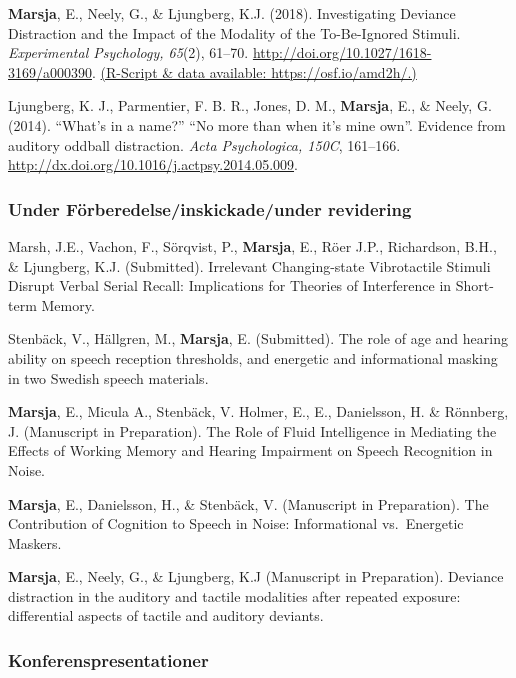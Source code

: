 \documentclass[]{article}
\begin{document}
\textbf{Marsja}, E., Neely, G., \& Ljungberg, K.J. (2018). Investigating
Deviance Distraction and the Impact of the Modality of the To-Be-Ignored
Stimuli. \emph{Experimental Psychology, 65}(2), 61--70.
\url{http://doi.org/10.1027/1618-3169/a000390}.
\href{https://osf.io/amd2h/}{(R-Script \& data available:
https://osf.io/amd2h/.)}

Ljungberg, K. J., Parmentier, F. B. R., Jones, D. M., \textbf{Marsja},
E., \& Neely, G. (2014). ``What's in a name?'' ``No more than when it's
mine own''. Evidence from auditory oddball distraction. \emph{Acta
Psychologica, 150C}, 161--166.
\href{http://doi.org/10.1027/1618-3169/a000390}{http://dx.doi.org/10.1016/j.actpsy.2014.05.009}.

\hypertarget{under-fuxf6rberedelseinskickadeunder-revidering}{%
\subsubsection{Under Förberedelse/inskickade/under
revidering}\label{under-fuxf6rberedelseinskickadeunder-revidering}}

Marsh, J.E., Vachon, F., Sörqvist, P., \textbf{Marsja}, E., Röer J.P.,
Richardson, B.H., \& Ljungberg, K.J. (Submitted). Irrelevant
Changing-state Vibrotactile Stimuli Disrupt Verbal Serial Recall:
Implications for Theories of Interference in Short-term Memory.

Stenbäck, V., Hällgren, M., \textbf{Marsja}, E. (Submitted). The role of
age and hearing ability on speech reception thresholds, and energetic
and informational masking in two Swedish speech materials.

\textbf{Marsja}, E., Micula A., Stenbäck, V. Holmer, E., E., Danielsson,
H. \& Rönnberg, J. (Manuscript in Preparation). The Role of Fluid
Intelligence in Mediating the Effects of Working Memory and Hearing
Impairment on Speech Recognition in Noise.

\textbf{Marsja}, E., Danielsson, H., \& Stenbäck, V. (Manuscript in
Preparation). The Contribution of Cognition to Speech in Noise:
Informational vs.~Energetic Maskers.

\textbf{Marsja}, E., Neely, G., \& Ljungberg, K.J (Manuscript in
Preparation). Deviance distraction in the auditory and tactile
modalities after repeated exposure: differential aspects of tactile and
auditory deviants.

\hypertarget{konferenspresentationer}{%
\subsubsection{Konferenspresentationer}\label{konferenspresentationer}}
\end{document}
